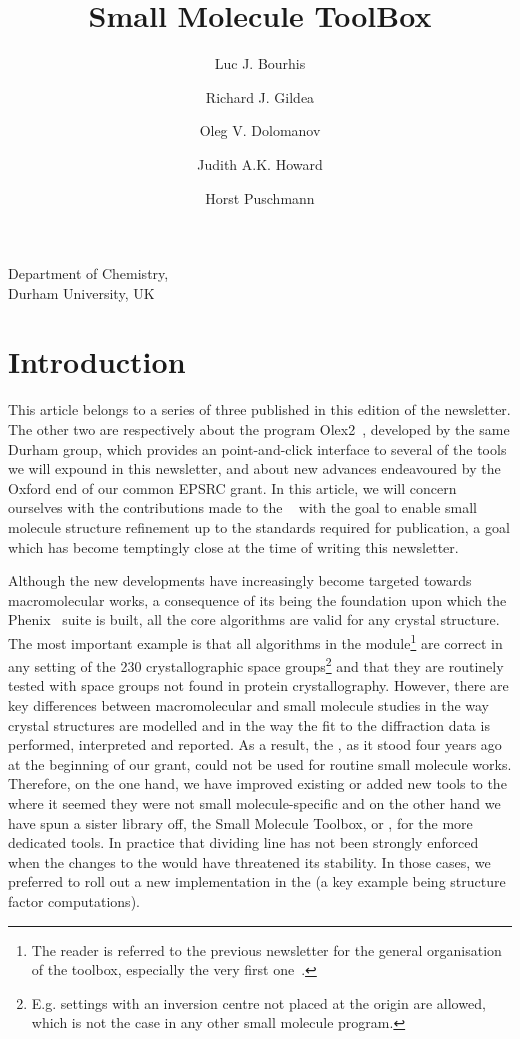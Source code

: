 \documentclass[12pt]{article}
\title{Small Molecule ToolBox}
\author{Luc J. Bourhis \and Richard J. Gildea \and Oleg V. Dolomanov \and Judith A.K. Howard \and Horst Puschmann}
\date{}
\begin{document}
\maketitle
\begin{center}
Department of Chemistry, \\
Durham University, UK
\end{center}

\section{Introduction}

This article belongs to a series of three published in this edition of the newsletter. The other two are respectively about the program Olex2~\cite{Dolomanov:2009}, developed by the same Durham group, which provides an point-and-click interface to several of the tools we will expound in this newsletter, and about new advances endeavoured by the Oxford end of our common EPSRC grant. In this article, we will concern ourselves with the contributions made to the \cctbx~\cite{cctbx} with the goal to enable small molecule structure refinement up to the standards required for publication, a goal which has become temptingly close at the time of writing this newsletter.

Although the \cctbx new developments have increasingly become targeted towards macromolecular works, a consequence of its being the foundation upon which the Phenix~\cite{phenix} suite is built, all the core algorithms are valid for any crystal structure. The most important example is that all algorithms in the \cctbx module\footnote{The reader is referred to the previous \cctbx newsletter for the general organisation of the toolbox, especially the very first one~\cite{Grosse-Kunstleve:2003}.} are correct in any setting of the 230 crystallographic space groups\footnote{E.g. settings with an inversion centre not placed at the origin are allowed, which is not the case in any other small molecule program.} and that they are routinely tested with space groups not found in protein crystallography. However, there are key differences between macromolecular and small molecule studies in the way crystal structures are modelled and in the way the fit to the diffraction data is performed, interpreted and reported. As a result, the \cctbx, as it stood four years ago at the beginning of our grant, could not be used for routine small molecule works. Therefore, on the one hand, we have improved existing or added new tools to the \cctbx where it seemed they were not small molecule-specific and on the other hand we have spun a sister library off, the Small Molecule Toolbox, or \smtbx, for the more dedicated tools. In practice that dividing line has not been strongly enforced when the changes to the \cctbx would have threatened its stability. In those cases, we preferred to roll out a new implementation in the \smtbx (a key example being structure factor computations).
\end{document}
